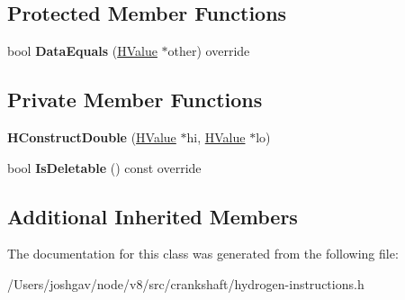 \subsection*{Protected Member Functions}
\begin{DoxyCompactItemize}
\item 
bool {\bfseries Data\+Equals} (\hyperlink{classv8_1_1internal_1_1_h_value}{H\+Value} $\ast$other) override\hypertarget{classv8_1_1internal_1_1_h_construct_double_a5a66fd03bb9e4f755106ec8a4512f46d}{}\label{classv8_1_1internal_1_1_h_construct_double_a5a66fd03bb9e4f755106ec8a4512f46d}

\end{DoxyCompactItemize}
\subsection*{Private Member Functions}
\begin{DoxyCompactItemize}
\item 
{\bfseries H\+Construct\+Double} (\hyperlink{classv8_1_1internal_1_1_h_value}{H\+Value} $\ast$hi, \hyperlink{classv8_1_1internal_1_1_h_value}{H\+Value} $\ast$lo)\hypertarget{classv8_1_1internal_1_1_h_construct_double_a4ee9fbb696824319df7861ae716122c2}{}\label{classv8_1_1internal_1_1_h_construct_double_a4ee9fbb696824319df7861ae716122c2}

\item 
bool {\bfseries Is\+Deletable} () const  override\hypertarget{classv8_1_1internal_1_1_h_construct_double_a82b184fa442a1aab9ee0046bb94f57b6}{}\label{classv8_1_1internal_1_1_h_construct_double_a82b184fa442a1aab9ee0046bb94f57b6}

\end{DoxyCompactItemize}
\subsection*{Additional Inherited Members}


The documentation for this class was generated from the following file\+:\begin{DoxyCompactItemize}
\item 
/\+Users/joshgav/node/v8/src/crankshaft/hydrogen-\/instructions.\+h\end{DoxyCompactItemize}
